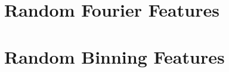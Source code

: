 \documentclass[11pt,twoside,a4paper]{report}
\begin{document}



\tableofcontents

%
\chapter{Random Fourier Features}

\chapter{Random Binning Features}




\printbibliography
\end{document}
